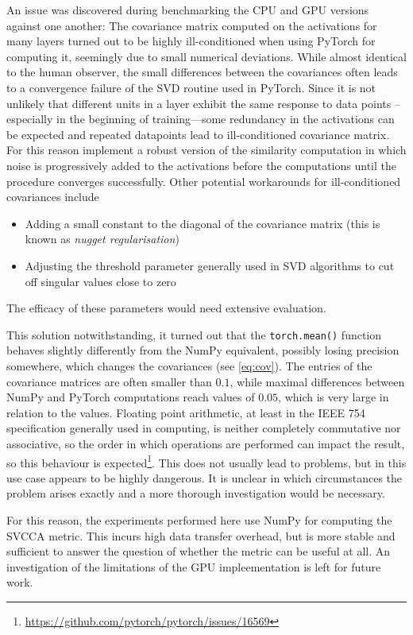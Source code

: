 An issue was discovered during benchmarking the CPU and GPU versions against one
another: The covariance matrix computed on the activations for many layers
turned out to be highly ill-conditioned when using PyTorch for computing it,
seemingly due to small numerical deviations. While almost identical to the human
observer, the small differences between the covariances often leads to a
convergence failure of the SVD routine used in PyTorch. Since it is not unlikely
that different units in a layer exhibit the same response to data points --
especially in the beginning of training---some redundancy in the activations
can be expected and repeated datapoints lead to ill-conditioned covariance
matrix. For this reason \citeauthor{raghu2017svcca} implement a robust version
of the similarity computation in which noise is progressively added to the
activations before the computations until the procedure converges successfully.
Other potential workarounds for ill-conditioned covariances include
\begin{itemize}
    \item Adding a small constant to the diagonal of the covariance matrix (this
        is known as \emph{nugget regularisation})
    \item Adjusting the threshold parameter generally used in SVD algorithms to
        cut off singular values close to zero
\end{itemize}
The efficacy of these parameters would need extensive evaluation.

This solution notwithstanding, it turned out
that the \texttt{torch.mean()} function behaves slightly differently from
the NumPy equivalent, possibly losing precision somewhere, which changes the
covariances (see \cref{eq:cov}).  The entries of the covariance matrices are
often smaller than $0.1$, while maximal differences between NumPy and PyTorch
computations reach values of $0.05$, which is very large in relation to the
values.
Floating point arithmetic, at least in the IEEE 754 specification generally used
in computing, is neither completely commutative nor associative, so the order in
which operations are performed can impact the result, so this behaviour is
expected\footnote{\url{https://github.com/pytorch/pytorch/issues/16569}}. This
does not usually lead to problems, but in this use case appears to be highly
dangerous. It is unclear in which circumstances the problem arises exactly and a
more thorough investigation would be necessary.

For this reason, the experiments
performed here use NumPy for computing the SVCCA metric. This incurs high data
transfer overhead, but is more stable and sufficient to answer the question of whether the
metric can be useful at all. An investigation of the limitations of the GPU
impleementation is left for future work.


